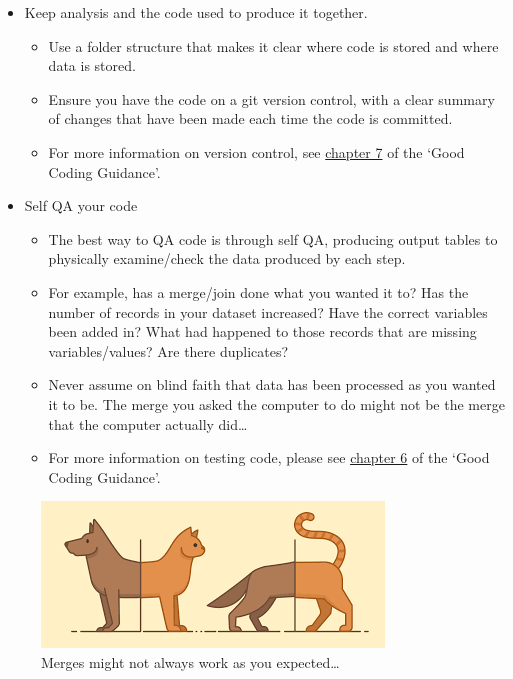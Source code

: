 \documentclass[
]{article}
\providecommand{\tightlist}{%
  \setlength{\itemsep}{0pt}\setlength{\parskip}{0pt}}
\begin{document}
\begin{itemize}
\tightlist
\item
  Keep analysis and the code used to produce it together.

  \begin{itemize}
  \tightlist
  \item
    Use a folder structure that makes it clear where code is stored and where data is stored.
  \item
    Ensure you have the code on a git version control, with a clear summary of changes that have been made each time the code is committed.
  \item
    For more information on version control, see \href{https://dfe-analytical-services.github.io/good-code-practice/VC.html}{chapter 7} of the `Good Coding Guidance'.
  \end{itemize}
\item
  Self QA your code

  \begin{itemize}
  \tightlist
  \item
    The best way to QA code is through self QA, producing output tables to physically examine/check the data produced by each step.
  \item
    For example, has a merge/join done what you wanted it to? Has the number of records in your dataset increased? Have the correct variables been added in? What had happened to those records that are missing variables/values? Are there duplicates?
  \item
    Never assume on blind faith that data has been processed as you wanted it to be. The merge you asked the computer to do might not be the merge that the computer actually did\ldots{}
  \item
    For more information on testing code, please see \href{https://dfe-analytical-services.github.io/good-code-practice/testing.html}{chapter 6} of the `Good Coding Guidance'.
  \end{itemize}
\end{itemize}

\begin{figure}
\centering
\includegraphics{pictures/merge_pic.png}
\caption{Merges might not always work as you expected\ldots{}}
\end{figure}
\end{document}
